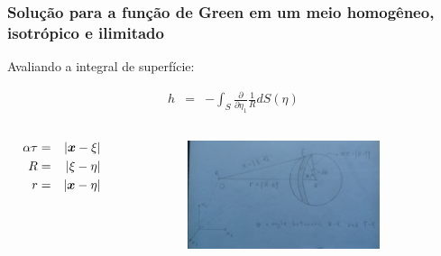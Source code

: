 \documentclass{beamer}
\newcommand{\xvec}{\vc{x}}
\newcommand{\xivec}{\boldmath \xi}
\begin{document}
\begin{frame}
	\frametitle{\textbf{Solu\c{c}\~ao para a fun\c{c}\~ao de Green em um meio homog\^eneo, isotr\'opico e ilimitado}}
	
	\begin{flushleft}
		Avaliando a integral de superf\'icie:
	\end{flushleft}
	\begin{eqnarray}
	\label{ten1}
	h &=& - \int_{S}\frac{\partial }{\partial \eta_{1}} \frac{1}{R} dS(\eta) \, 
	\end{eqnarray}
	
	\begin{columns}        
		\begin{column}{0.15\textwidth}  
			\begin{eqnarray*}
				\alpha\tau &=& \left| \xvec - \xivec \right|\\
				R &=& \left| \xivec -\eta \right|\\
				r &=&  \left| \xvec - \eta \right|
			\end{eqnarray*}
		\end{column}
		\begin{column}{0.75\textwidth}    
			\begin{figure}[h!]   
				\includegraphics[width=248px, height=120px]{Fig11.jpg}     
			\end{figure}
		\end{column}
	\end{columns}
	
\end{frame}%
\end{document}
